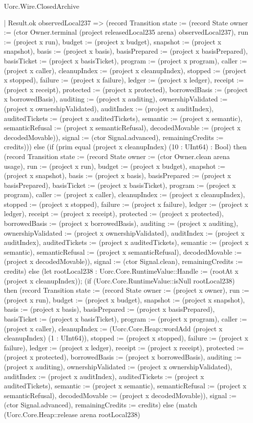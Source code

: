 \begin{lexlean}{Uorc.Wire.ClosedArchive}
\begin{semanticmodule}
{      | Result.ok observedLocal237 => (record Transition {state := (record State {owner := (ctor Owner.terminal (project releasedLocal235 arena) observedLocal237), run := (project x run), budget := (project x budget), snapshot := (project x snapshot), basis := (project x basis), basisPrepared := (project x basisPrepared), basisTicket := (project x basisTicket), program := (project x program), caller := (project x caller), cleanupIndex := (project x cleanupIndex), stopped := (project x stopped), failure := (project x failure), ledger := (project x ledger), receipt := (project x receipt), protected := (project x protected), borrowedBasis := (project x borrowedBasis), auditing := (project x auditing), ownershipValidated := (project x ownershipValidated), auditIndex := (project x auditIndex), auditedTickets := (project x auditedTickets), semantic := (project x semantic), semanticRefusal := (project x semanticRefusal), decodedMovable := (project x decodedMovable)}), signal := (ctor Signal.advanced), remainingCredits := credits}))) else (if (prim equal (project x cleanupIndex) (10 : UInt64) : Bool) then (record Transition {state := (record State {owner := (ctor Owner.clean arena usage), run := (project x run), budget := (project x budget), snapshot := (project x snapshot), basis := (project x basis), basisPrepared := (project x basisPrepared), basisTicket := (project x basisTicket), program := (project x program), caller := (project x caller), cleanupIndex := (project x cleanupIndex), stopped := (project x stopped), failure := (project x failure), ledger := (project x ledger), receipt := (project x receipt), protected := (project x protected), borrowedBasis := (project x borrowedBasis), auditing := (project x auditing), ownershipValidated := (project x ownershipValidated), auditIndex := (project x auditIndex), auditedTickets := (project x auditedTickets), semantic := (project x semantic), semanticRefusal := (project x semanticRefusal), decodedMovable := (project x decodedMovable)}), signal := (ctor Signal.clean), remainingCredits := credits}) else (let rootLocal238 : Uorc.Core.RuntimeValue::Handle := (rootAt x (project x cleanupIndex)); (if (Uorc.Core.RuntimeValue::isNull rootLocal238) then (record Transition {state := (record State {owner := (project x owner), run := (project x run), budget := (project x budget), snapshot := (project x snapshot), basis := (project x basis), basisPrepared := (project x basisPrepared), basisTicket := (project x basisTicket), program := (project x program), caller := (project x caller), cleanupIndex := (Uorc.Core.Heap::wordAdd (project x cleanupIndex) (1 : UInt64)), stopped := (project x stopped), failure := (project x failure), ledger := (project x ledger), receipt := (project x receipt), protected := (project x protected), borrowedBasis := (project x borrowedBasis), auditing := (project x auditing), ownershipValidated := (project x ownershipValidated), auditIndex := (project x auditIndex), auditedTickets := (project x auditedTickets), semantic := (project x semantic), semanticRefusal := (project x semanticRefusal), decodedMovable := (project x decodedMovable)}), signal := (ctor Signal.advanced), remainingCredits := credits}) else (match (Uorc.Core.Heap::release arena rootLocal238)
}
\end{semanticmodule}
\end{lexlean}
